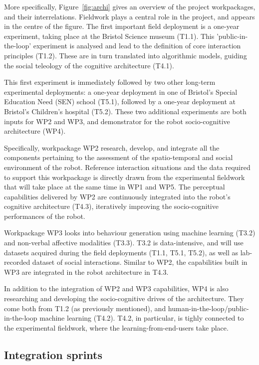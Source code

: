 \documentclass[11pt,a4paper]{report}
\begin{document}
More specifically, Figure~\ref{fig:archi} gives an overview of the project
workpackages, and their interrelations. Fieldwork plays a central role in the
project, and appears in the centre of the figure. The first important field
deployment is a one-year experiment, taking place at the Bristol Science museum
(T1.1). This 'public-in-the-loop' experiment is analysed and lead to the
definition of core interaction principles (T1.2). These are in turn translated
into algorithmic models, guiding the social teleology of the cognitive
architecture (T4.1).

This first experiment is immediately followed by two other long-term
experimental deployments: a one-year deployment in one of Bristol's Special
Education Need (SEN) school (T5.1), followed by a one-year deployment at
Bristol's Children's hospital (T5.2). These two additional experiments are both
inputs for WP2 and WP3, and demonstrator for the robot socio-cognitive
architecture (WP4).

Specifically, workpackage WP2 research, develop, and integrate all the components
pertaining to the assessment of the spatio-temporal and social environment of
the robot. Reference interaction situations and the data required to support
this workpackage is directly drawn from the experimental fieldwork that will
take place at the same time in WP1 and WP5. The perceptual capabilities
delivered by WP2 are continuously integrated into the robot's cognitive
architecture (T4.3), iteratively improving the socio-cognitive performances of
the robot.

Workpackage WP3 looks into behaviour generation using machine learning (T3.2)
and non-verbal affective modalities (T3.3). T3.2 is data-intensive, and will use
datasets acquired during the field deployments (T1.1, T5.1, T5.2), as well as
lab-recorded dataset of social interactions. Similar to WP2, the capabilities
built in WP3 are integrated in the robot architecture in T4.3.

In addition to the integration of WP2 and WP3 capabilities, WP4 is also
researching and developing the socio-cognitive drives of the architecture. They
come both from T1.2 (as previously mentioned), and
human-in-the-loop/public-in-the-loop machine learning (T4.2). T4.2, in
particular, is tighly connected to the experimental fieldwork, where the
learning-from-end-users take place.

\subsection{Integration sprints}
\end{document}
